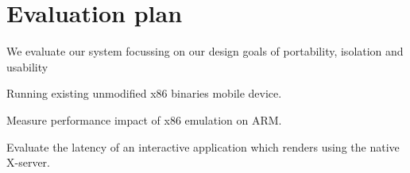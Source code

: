 \section{Evaluation plan}
We evaluate our system focussing on our design goals of portability, isolation and usability
	\begin{itemize*}
	\item Running existing unmodified x86 binaries mobile device.
	\item Measure performance impact of x86 emulation on ARM.
	\item Evaluate the latency of an interactive application which renders using the native X-server.
	\end{itemize*}
